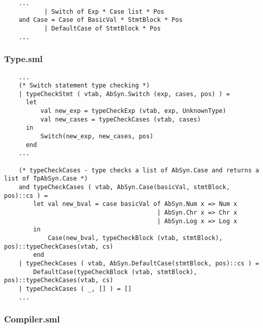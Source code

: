 \documentclass[12pt]{article}
\begin{document}
\begin{lstlisting}
    ...
           | Switch of Exp * Case list * Pos
    and Case = Case of BasicVal * StmtBlock * Pos
           | DefaultCase of StmtBlock * Pos
    ...
\end{lstlisting}

\subsubsection{Type.sml}

\begin{lstlisting}
    ...
    (* Switch statement type checking *)
    | typeCheckStmt ( vtab, AbSyn.Switch (exp, cases, pos) ) = 
      let 
          val new_exp = typeCheckExp (vtab, exp, UnknownType)
          val new_cases = typeCheckCases (vtab, cases)
      in
          Switch(new_exp, new_cases, pos)
      end
    ...
    
    (* typeCheckCases - type checks a list of AbSyn.Case and returns a list of TpAbSyn.Case *)
    and typeCheckCases ( vtab, AbSyn.Case(basicVal, stmtBlock, pos)::cs ) =
        let val new_bval = case basicVal of AbSyn.Num x => Num x
                                          | AbSyn.Chr x => Chr x
                                          | AbSyn.Log x => Log x
        in 
            Case(new_bval, typeCheckBlock (vtab, stmtBlock), pos)::typeCheckCases(vtab, cs) 
        end 
    | typeCheckCases ( vtab, AbSyn.DefaultCase(stmtBlock, pos)::cs ) =
        DefaultCase(typeCheckBlock (vtab, stmtBlock), pos)::typeCheckCases(vtab, cs) 
    | typeCheckCases ( _, [] ) = []
    ...
\end{lstlisting}

\pagebreak

\subsubsection{Compiler.sml}
\end{document}
